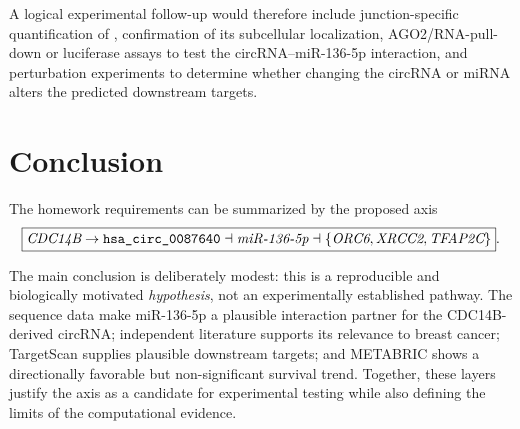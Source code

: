 \documentclass[11pt]{article}
\newcommand{\mir}[1]{\textit{#1}}
\newcommand{\gene}[1]{\textit{#1}}
\newcommand{\circrna}[1]{\texttt{\detokenize{#1}}}
\begin{document}
A logical experimental follow-up would therefore include junction-specific quantification of \circrna{hsa_circ_0087640}, confirmation of its subcellular localization, AGO2/RNA-pull-down or luciferase assays to test the circRNA--miR-136-5p interaction, and perturbation experiments to determine whether changing the circRNA or miRNA alters the predicted downstream targets.

\section{Conclusion}

The homework requirements can be summarized by the proposed axis
\[
\boxed{
\gene{CDC14B}
\rightarrow
\circrna{hsa_circ_0087640}
\dashv
\mir{miR-136-5p}
\dashv
\{\gene{ORC6},\gene{XRCC2},\gene{TFAP2C}\}
}.
\]

The main conclusion is deliberately modest: this is a reproducible and biologically motivated \emph{hypothesis}, not an experimentally established pathway. The sequence data make miR-136-5p a plausible interaction partner for the CDC14B-derived circRNA; independent literature supports its relevance to breast cancer; TargetScan supplies plausible downstream targets; and METABRIC shows a directionally favorable but non-significant survival trend. Together, these layers justify the axis as a candidate for experimental testing while also defining the limits of the computational evidence.
\end{document}
